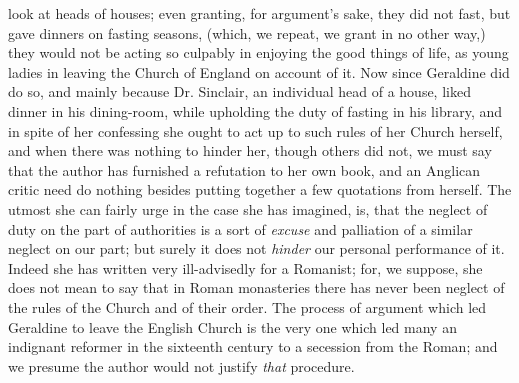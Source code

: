 look at heads of houses; even granting, for argument's sake, they did
not fast, but gave dinners on fasting seasons, (which, we repeat, we
grant in no other way,) they would not be acting so culpably in enjoying
the good things of life, as young ladies in leaving the Church of
England on account of it. Now since Geraldine did do so, and mainly
because Dr. Sinclair, an individual head of a house, liked dinner in his
dining-room, while upholding the duty of fasting in his library, and in
spite of her confessing she ought to act up to such rules of her Church
herself, and when there was nothing to hinder her, though others did
not, we must say that the author has furnished a refutation to her own
book, and an Anglican critic need do nothing besides putting together a
few quotations from herself. The utmost she can fairly urge in the case
she has imagined, is, that the neglect of duty on the part of
authorities is a sort of \emph{excuse} and palliation of a similar
neglect on our part; but surely it does not \emph{hinder} our personal
performance of it. Indeed she has written very ill-advisedly for a
Romanist; for, we suppose, she does not mean to say that in Roman
monasteries there has never been neglect of the rules of the Church
and of their order. The process of argument which led Geraldine to leave
the English Church is the very one which led many an indignant reformer
in the sixteenth century to a secession from the Roman; and we presume
the author would not justify \emph{that} procedure.


